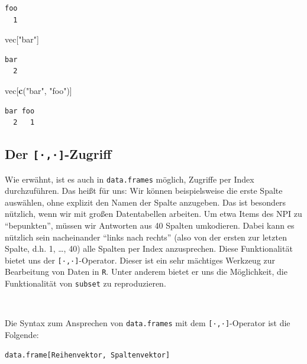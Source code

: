 \documentclass[12pt,]{tufte-book}
\newenvironment{Shaded}{\begin{snugshade}}{\end{snugshade}}
\newcommand{\KeywordTok}[1]{\textcolor[rgb]{0.13,0.29,0.53}{\textbf{#1}}}
\newcommand{\StringTok}[1]{\textcolor[rgb]{0.31,0.60,0.02}{#1}}
\newcommand{\NormalTok}[1]{#1}
\theoremstyle{definition}
\theoremstyle{definition}
\theoremstyle{definition}
\theoremstyle{remark}
\begin{document}
\begin{verbatim}
foo 
  1 
\end{verbatim}

\begin{Shaded}
\begin{Highlighting}[]
\NormalTok{vec[}\StringTok{"bar"}\NormalTok{]}
\end{Highlighting}
\end{Shaded}

\begin{verbatim}
bar 
  2 
\end{verbatim}

\begin{Shaded}
\begin{Highlighting}[]
\NormalTok{vec[}\KeywordTok{c}\NormalTok{(}\StringTok{"bar"}\NormalTok{, }\StringTok{"foo"}\NormalTok{)]}
\end{Highlighting}
\end{Shaded}

\begin{verbatim}
bar foo 
  2   1 
\end{verbatim}

\subsection{\texorpdfstring{Der
\texttt{{[}·,·{]}}-Zugriff}{Der {[}·,·{]}-Zugriff}}\label{der--zugriff-2}

Wie erwähnt, ist es auch in \texttt{data.frames} möglich, Zugriffe per
Index durchzuführen. Das heißt für uns: Wir können beispielsweise die
erste Spalte auswählen, ohne explizit den Namen der Spalte anzugeben.
Das ist besonders nützlich, wenn wir mit großen Datentabellen arbeiten.
Um etwa Items des NPI zu ``bepunkten'', müssen wir Antworten aus 40
Spalten umkodieren. Dabei kann es nützlich sein nacheinander ``links
nach rechts'' (also von der ersten zur letzten Spalte, d.h. 1, \ldots{},
40) alle Spalten per Index anzusprechen. Diese Funktionalität bietet uns
der \texttt{{[}·,·{]}}-Operator. Dieser ist ein sehr mächtiges Werkzeug
zur Bearbeitung von Daten in \texttt{R}. Unter anderem bietet er uns die
Möglichkeit, die Funktionalität von \texttt{subset} zu reproduzieren.

~

Die Syntax zum Ansprechen von \texttt{data.frames} mit dem
\texttt{{[}·,·{]}}-Operator ist die Folgende:

\begin{verbatim}
data.frame[Reihenvektor, Spaltenvektor]
\end{verbatim}
\end{document}
